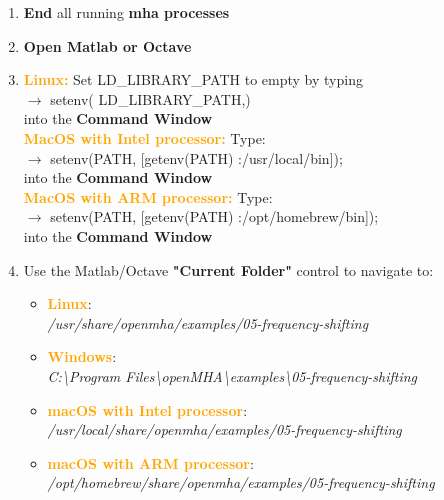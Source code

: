 \documentclass[11pt,a4paper,twoside]{article}
\newcommand{\+}{\discretionary{\mbox{\scriptsize$\hookleftarrow$}}{}{}}
\begin{document}
{{\begin{enumerate}
\item \textbf{End} all running \textbf{mha processes} 
\item \textbf{Open Matlab or Octave} 
\item \textcolor{orange}{\textbf{Linux:}} Set LD\_LIBRARY\_PATH to empty by typing \\ {\ttfamily
  $\rightarrow$ setenv(\textquotesingle
  LD\_LIBRARY\_PATH\textquotesingle,\textquotesingle\textquotesingle)} \\
  into the \textbf{Command Window} \\
  \textcolor{orange}{\textbf{MacOS with Intel processor:}} Type: \\{\ttfamily $\rightarrow$ setenv(\textquotesingle PATH\textquotesingle, [getenv(\textquotesingle PATH\textquotesingle) \textquotesingle :/usr/local/bin\textquotesingle]);} \\
  into the \textbf{Command Window} \\  
  \textcolor{orange}{\textbf{MacOS with ARM processor:}} Type: \\{\ttfamily $\rightarrow$ setenv(\textquotesingle PATH\textquotesingle, [getenv(\textquotesingle PATH\textquotesingle) \textquotesingle :/opt/homebrew/bin\textquotesingle]);} \\
  into the \textbf{Command Window} \\  
\item Use the Matlab/Octave \textbf{"Current Folder"} control to navigate to:

\begin{itemize}
\item \textcolor{orange}{\textbf{Linux}}: \\
  \textit{/usr/share/openmha/examples/05-frequency-shifting}
\item \textcolor{orange}{\textbf{Windows}}: \\
  \textit{C:\textbackslash Program Files\textbackslash openMHA\textbackslash examples\textbackslash 05-frequency-shifting}
\item \textcolor{orange}{\textbf{macOS with Intel processor}}: \\
  \textit{/usr/local/share/openmha/examples/05-frequency-shifting}
\item \textcolor{orange}{\textbf{macOS with ARM processor}}: \\
  \textit{/opt/homebrew/share/openmha/examples/05-frequency-shifting}
\end{itemize}


\end{enumerate}}}
\end{document}
